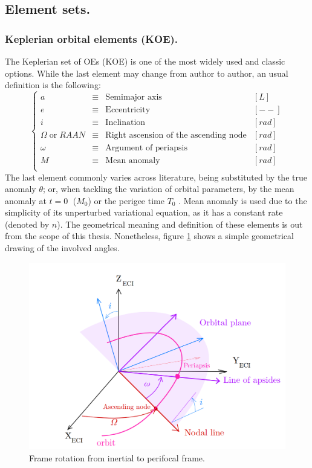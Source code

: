 	\subsection{Element sets.}
	\subsubsection{Keplerian orbital elements (KOE).}\label{secAppA:KOE}
	\indent The Keplerian set of OEs (KOE) is one of the most widely used and classic options. While the last element may change from author to author, an usual definition is the following:
	\begin{equation}
	\left\{ 
	\begin{array}{llll}
	a & \equiv & \text{Semimajor axis} & [L]\\
	e & \equiv & \text{Eccentricity} & [--]\\
	i & \equiv & \text{Inclination} & [rad]\\
	\Omega \; \text{or} \; RAAN & \equiv & \text{Right ascension of the ascending node} & [rad]\\
	\omega & \equiv & \text{Argument of periapsis} & [rad]\\
	M & \equiv & \text{Mean anomaly} & [rad]\\
	\end{array}
	\right.
	\end{equation}
	\indent The last element commonly varies across literature, being substituted by the true anomaly $\theta$; or, when tackling the variation of orbital parameters, by the mean anomaly at $t = 0 \; $ ($M_0$) or the perigee time $T_0$ \cite{Wiesel}. Mean anomaly is used due to the simplicity of its unperturbed variational equation, as it has a constant rate (denoted by $n$). The geometrical meaning and definition of these elements is out from the scope of this thesis. Nonetheless, figure \ref{fig: 	orbit_angles} shows a simple geometrical drawing of the involved angles.\\
    \begin{figure}[!htb]
    \centering\includegraphics[width = 0.7\linewidth]{Appendices/Appendix_A/orbit_angles}
    \caption{Frame rotation from inertial to perifocal frame.}
    \label{fig: 	orbit_angles}
	\end{figure}
